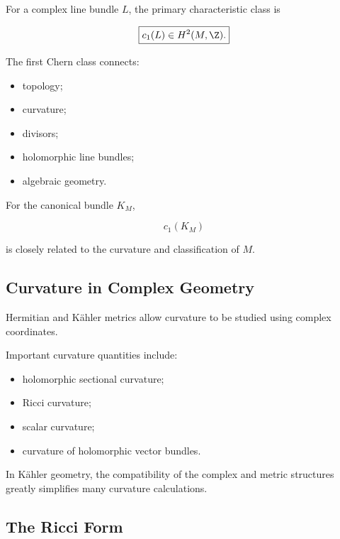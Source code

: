 For a complex line bundle \(L\), the primary characteristic class is

\[
\boxed{
c_1(L)\in H^2(M,\Z).
}
\]

The first Chern class connects:

\begin{itemize}
    \item topology;
    \item curvature;
    \item divisors;
    \item holomorphic line bundles;
    \item algebraic geometry.
\end{itemize}

For the canonical bundle \(K_M\),

\[
c_1(K_M)
\]

is closely related to the curvature and classification of \(M\).

\subsection{Curvature in Complex Geometry}
\label{subsec:curvature-complex-geometry}

Hermitian and K\"ahler metrics allow curvature to be studied using complex
coordinates.

Important curvature quantities include:

\begin{itemize}
    \item holomorphic sectional curvature;
    \item Ricci curvature;
    \item scalar curvature;
    \item curvature of holomorphic vector bundles.
\end{itemize}

In K\"ahler geometry, the compatibility of the complex and metric structures
greatly simplifies many curvature calculations.

\subsection{The Ricci Form}
\label{subsec:ricci-form-complex}

